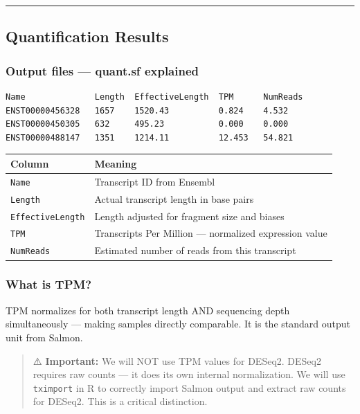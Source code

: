 \documentclass[
]{article}
\begin{document}
\begin{center}\rule{0.5\linewidth}{0.5pt}\end{center}

\subsection{Quantification Results}\label{quantification-results}

\subsubsection{Output files --- quant.sf
explained}\label{output-files-quant.sf-explained}

\begin{verbatim}
Name              Length  EffectiveLength  TPM      NumReads
ENST00000456328   1657    1520.43          0.824    4.532
ENST00000450305   632     495.23           0.000    0.000
ENST00000488147   1351    1214.11          12.453   54.821
\end{verbatim}

\begin{longtable}[]{@{}ll@{}}
\toprule\noalign{}
Column & Meaning \\
\midrule\noalign{}
\endhead
\bottomrule\noalign{}
\endlastfoot
\texttt{Name} & Transcript ID from Ensembl \\
\texttt{Length} & Actual transcript length in base pairs \\
\texttt{EffectiveLength} & Length adjusted for fragment size and
biases \\
\texttt{TPM} & Transcripts Per Million --- normalized expression
value \\
\texttt{NumReads} & Estimated number of reads from this transcript \\
\end{longtable}

\subsubsection{What is TPM?}\label{what-is-tpm}

TPM normalizes for both transcript length AND sequencing depth
simultaneously --- making samples directly comparable. It is the
standard output unit from Salmon.

\begin{quote}
⚠️ \textbf{Important:} We will NOT use TPM values for DESeq2. DESeq2
requires raw counts --- it does its own internal normalization. We will
use \texttt{tximport} in R to correctly import Salmon output and extract
raw counts for DESeq2. This is a critical distinction.
\end{quote}
\end{document}
